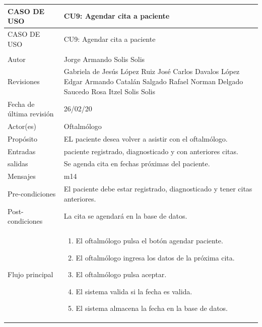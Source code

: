 \documentclass[10pt]{article}
\begin{document}
\begin{longtable}{|p{3.8cm}|p{10.8cm}|}
\hline
CASO DE USO & CU9: Agendar cita a paciente\\
\hline 
\endfirsthead

\hline

CASO DE USO & CU9: Agendar cita a paciente\\
\hline 
\endhead

\multicolumn{2}{c}{}
\endfoot

\endlastfoot
\hline
versión & 1\\
\hline
Autor & Jorge Armando Solis Solis\\
\hline
Revisiones & Gabriela de Jesús López Ruiz\newline
José Carlos Davalos López\newline
Edgar Armando Catalán Salgado\newline
Rafael Norman Delgado Saucedo\newline
Rosa Itzel Solis Solis
\\

\hline
Fecha de última revisión & 26/02/20\\
\hline
Actor(es) & Oftalmólogo \\
\hline
Propósito & EL paciente desea volver a asistir con el oftalmólogo.\\
\hline
Entradas & paciente registrado, diagnosticado y con anteriores citas.\\
\hline
salidas & Se agenda cita en fechas próximas del paciente.\\
\hline
Mensajes & m14\\
\hline
Pre-condiciones & El paciente debe estar registrado, diagnosticado y tener citas anteriores.\\
\hline
Post-condiciones & La cita se agendará en la base de datos.\\
\hline
Flujo principal & \begin{enumerate}
    \item El oftalmólogo pulsa el botón agendar paciente.
    \item El oftalmólogo ingresa los datos de la próxima cita.
    \item El oftalmólogo pulsa aceptar.
    \item El sistema valida si la fecha es valida.
    \item El sistema almacena la fecha en la base de datos.
    

\end{enumerate}
\end{longtable}
\end{document}
